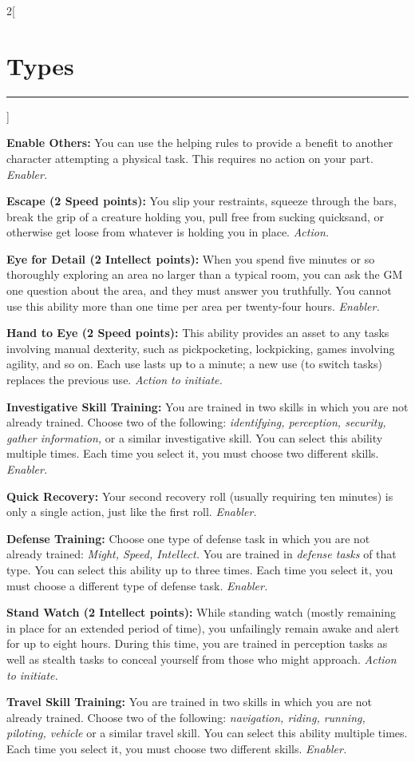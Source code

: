 \documentclass[a4paper,10pt,final]{book}
\newcommand{\HRule}{\rule{\linewidth}{0.5mm}} %
\newcommand{\newSection}[1]{\section*{#1} \addcontentsline{toc}{section}{#1} \label{sec:#1} \HRule}
\newcommand{\itemAbility}[2]{\textcolor{25gray}{\textbullet\textbf{ #1:}} {#2}\par}
\newcommand{\enabler}{\textit{ Enabler.}}
\newcommand{\action}{\textit{ Action.}}
\newcommand{\actionInit}{\textit{ Action to initiate.}}
\newenvironment{docsection}[1]
{
  \begin{multicols*}{2}[\newSection{#1}]
}
{
  \end{multicols*}
  \newpage
}
\begin{document}
\begin{docsection}{Types}
\itemAbility{Enable Others}{You can use the helping rules to provide a benefit to another character attempting a physical task. This requires no action on your part.\enabler}

\itemAbility{Escape (2 Speed points)}{You slip your restraints, squeeze through the bars, break the grip of a creature holding you, pull free from sucking quicksand, or otherwise get loose from whatever is holding you in place.\action}

\itemAbility{Eye for Detail (2 Intellect points)}{When you spend five minutes or so thoroughly exploring an area no larger than a typical room, you can ask the GM one question about the area, and they must answer you truthfully. You cannot use this ability more than one time per area per twenty-four hours.\enabler}

\itemAbility{Hand to Eye (2 Speed points)}{This ability provides an asset to any tasks involving manual dexterity, such as pickpocketing, lockpicking, games involving agility, and so on. Each use lasts up to a minute; a new use (to switch tasks) replaces the previous use.\actionInit}

\itemAbility{Investigative Skill Training}{You are trained in two skills in which you are not already trained. Choose two of the following: \textit{identifying, perception, security, gather information,} or a similar investigative skill. You can select this ability multiple times. Each time you select it, you must choose two different skills.\enabler}

\itemAbility{Quick Recovery}{Your second recovery roll (usually requiring ten minutes) is only a single action, just like the first roll.\enabler}

\itemAbility{Defense Training}{Choose one type of defense task in which you are not already trained: \textit{Might, Speed, Intellect.} You are trained in \emph{defense tasks} of that type. You can select this ability up to three times. Each time you select it, you must choose a different type of defense task.\enabler}

\itemAbility{Stand Watch (2 Intellect points)}{While standing watch (mostly remaining in place for an extended period of time), you unfailingly remain awake and alert for up to eight hours. During this time, you are trained in perception tasks as well as stealth tasks to conceal yourself from those who might approach.\actionInit}

\itemAbility{Travel Skill Training}{You are trained in two skills in which you are not already trained. Choose two of the following: \textit{navigation, riding, running, piloting, vehicle} or a similar travel skill. You can select this ability multiple times. Each time you select it, you must choose two different skills.\enabler}


\end{docsection}
\end{document}
